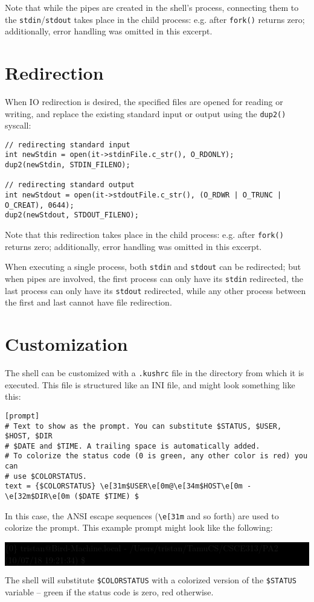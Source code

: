 \documentclass[10pt]{article}
\begin{document}
Note that while the pipes are created in the shell's process, connecting them to the \texttt{stdin}/\texttt{stdout} takes place in the child process: e.g. after \texttt{fork()} returns zero; additionally, error handling was omitted in this excerpt.

\section{Redirection}
When IO redirection is desired, the specified files are opened for reading or writing, and replace the existing standard input or output using the \texttt{dup2()} syscall:

\begin{verbatim}
// redirecting standard input
int newStdin = open(it->stdinFile.c_str(), O_RDONLY);
dup2(newStdin, STDIN_FILENO);

// redirecting standard output
int newStdout = open(it->stdoutFile.c_str(), (O_RDWR | O_TRUNC | O_CREAT), 0644);
dup2(newStdout, STDOUT_FILENO);
\end{verbatim}

Note that this redirection takes place in the child process: e.g. after \texttt{fork()} returns zero; additionally, error handling was omitted in this excerpt.

When executing a single process, both \texttt{stdin} and \texttt{stdout} can be redirected; but when pipes are involved, the first process can only have its \texttt{stdin} redirected, the last process can only have its \texttt{stdout} redirected, while any other process between the first and last cannot have file redirection.

\section{Customization}
The shell can be customized with a \texttt{.kushrc} file in the directory from which it is executed. This file is structured like an INI file, and might look something like this:

\begin{verbatim}
[prompt]
# Text to show as the prompt. You can substitute $STATUS, $USER, $HOST, $DIR
# $DATE and $TIME. A trailing space is automatically added.
# To colorize the status code (0 is green, any other color is red) you can
# use $COLORSTATUS.
text = {$COLORSTATUS} \e[31m$USER\e[0m@\e[34m$HOST\e[0m - \e[32m$DIR\e[0m ($DATE $TIME) $
\end{verbatim}

In this case, the ANSI escape sequences (\texttt{\textbackslash e[31m} and so forth) are used to colorize the prompt. This example prompt might look like the following:

\colorbox{black}{
\color{white}
\tt

\{{\color{green}0}\} {\color{red}tristan}@{\color{cyan}Bird-Machine.local} - {\color{green}/Users/tristan/TamuCS/CSCE313/PA2} (10/07/18 19:21:34) \$
}

The shell will substitute \texttt{\$COLORSTATUS} with a colorized version of the \texttt{\$STATUS} variable -- green if the status code is zero, red otherwise.
\end{document}
